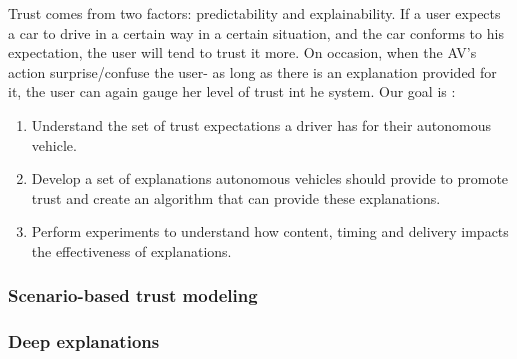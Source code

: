 Trust comes from two factors: predictability and explainability.
If a user expects a car to drive in a certain way in a certain situation, and the car conforms to his expectation, the user will tend to trust it more.
On occasion, when the AV’s action surprise/confuse the user- as long as there is an explanation provided for it, the user can again gauge her level of trust int he system.
Our goal is :
\begin{enumerate}[itemsep=0pt,parsep=0pt,topsep=4pt,leftmargin=0.4in]
    \item Understand the set of trust expectations a driver has for their autonomous vehicle.
    \item Develop a set of explanations autonomous vehicles should provide to promote trust and create an algorithm that can provide these explanations.
    \item Perform experiments to understand how content, timing and delivery impacts the effectiveness of explanations.
\end{enumerate}

\subsubsection{Scenario-based trust modeling}
\label{subsec:trust-modeling}




\subsubsection{Deep explanations}
\label{subsec:explainability}
